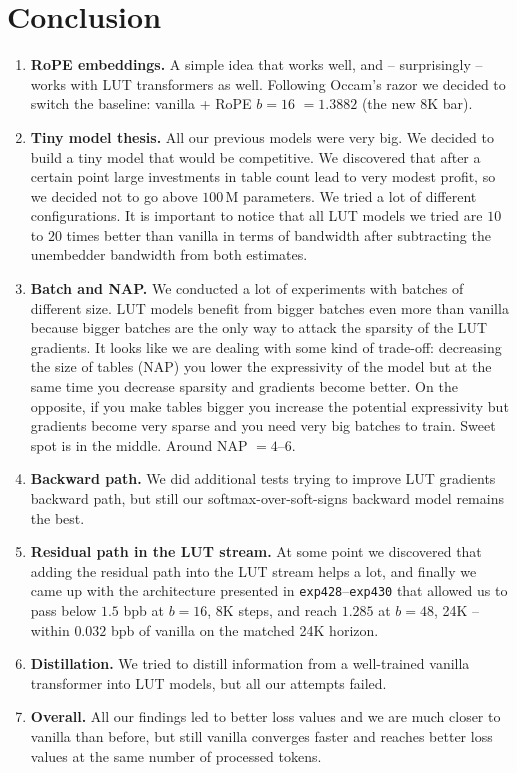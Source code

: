 \documentclass[11pt]{article}
\begin{document}
\section*{Conclusion}

\begin{enumerate}[itemsep=2pt, topsep=4pt]
\item \textbf{RoPE embeddings.} A simple idea that works well, and -- surprisingly -- works with LUT transformers as well. Following Occam's razor we decided to switch the baseline: vanilla + RoPE $b{=}16$ $= 1.3882$ (the new 8K bar).
\item \textbf{Tiny model thesis.} All our previous models were very big. We decided to build a tiny model that would be competitive. We discovered that after a certain point large investments in table count lead to very modest profit, so we decided not to go above $100$\,M parameters. We tried a lot of different configurations. It is important to notice that all LUT models we tried are $10$ to $20$ times better than vanilla in terms of bandwidth after subtracting the unembedder bandwidth from both estimates.
\item \textbf{Batch and NAP.} We conducted a lot of experiments with batches of different size. LUT models benefit from bigger batches even more than vanilla because bigger batches are the only way to attack the sparsity of the LUT gradients. It looks like we are dealing with some kind of trade-off: decreasing the size of tables (NAP) you lower the expressivity of the model but at the same time you decrease sparsity and gradients become better. On the opposite, if you make tables bigger you increase the potential expressivity but gradients become very sparse and you need very big batches to train. Sweet spot is in the middle. Around NAP $= 4$--$6$.
\item \textbf{Backward path.} We did additional tests trying to improve LUT gradients backward path, but still our softmax-over-soft-signs backward model remains the best.
\item \textbf{Residual path in the LUT stream.} At some point we discovered that adding the residual path into the LUT stream helps a lot, and finally we came up with the architecture presented in \texttt{exp428}--\texttt{exp430} that allowed us to pass below $1.5$ bpb at $b{=}16$, 8K steps, and reach $1.285$ at $b{=}48$, 24K -- within $0.032$ bpb of vanilla on the matched 24K horizon.
\item \textbf{Distillation.} We tried to distill information from a well-trained vanilla transformer into LUT models, but all our attempts failed.
\item \textbf{Overall.} All our findings led to better loss values and we are much closer to vanilla than before, but still vanilla converges faster and reaches better loss values at the same number of processed tokens.
\end{enumerate}
\end{document}
